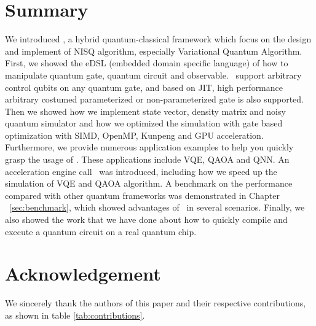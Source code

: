 \documentclass[pra,twocolumn,superscriptaddress,floatfix,nofootinbib,amsmath,amssymb]{revtex4-1}
\numberwithin{equation}{section}
\numberwithin{figure}{section}
\numberwithin{table}{section}
\begin{document}
% 

\section{Summary}
\label{sec:summary}
We introduced \MindQuantum, a hybrid quantum-classical framework which focus on the design and implement of NISQ algorithm, especially Variational Quantum Algorithm. First, we showed the eDSL (embedded domain specific language) of how to manipulate quantum gate, quantum circuit and observable. \MindQuantum\ support arbitrary control qubits on any quantum gate, and based on JIT, high performance arbitrary costumed parameterized or non-parameterized gate is also supported. Then we showed how we implement state vector, density matrix and noisy quantum simulator and how we optimized the simulation with gate based optimization with SIMD, OpenMP, Kunpeng and GPU acceleration. Furthermore, we provide numerous application examples to help you quickly grasp the usage of \MindQuantum. These applications include VQE, QAOA and QNN. An acceleration engine call \QuPack\ was introduced, including how we speed up the simulation of VQE and QAOA algorithm. A benchmark on the performance compared with other quantum frameworks was demonstrated in Chapter ~\ref{sec:benchmark}, which showed advantages of \MindQuantum\ in several scenarios. Finally, we also showed the work that we have done about how to quickly compile and execute a quantum circuit on a real quantum chip.

\section{Acknowledgement}
\label{sec:acknowledgement}
We sincerely thank the authors of this paper and their respective contributions, as shown in table \ref{tab:contributions}.
\end{document}

